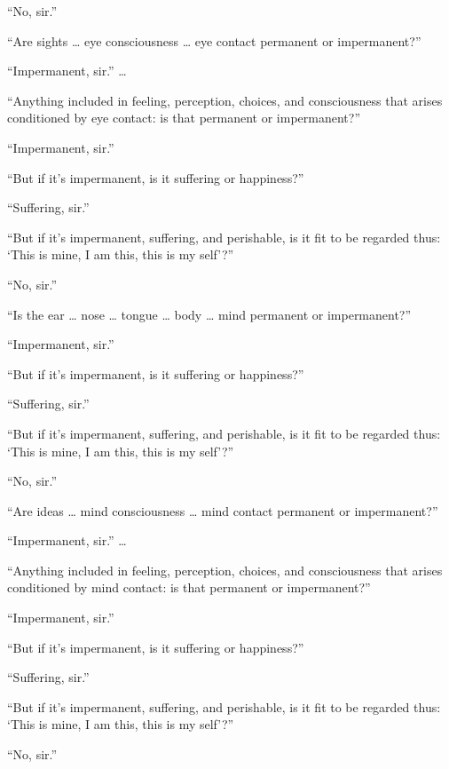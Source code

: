\documentclass[12pt,openany]{book}%
\begin{document}
“No, sir.” 

“Are sights … eye consciousness … eye contact permanent or impermanent?” 

“Impermanent, sir.” … 

“Anything included in feeling, perception, choices, and consciousness that arises conditioned by eye contact: is that permanent or impermanent?” 

“Impermanent, sir.” 

“But if it’s impermanent, is it suffering or happiness?” 

“Suffering, sir.” 

“But if it’s impermanent, suffering, and perishable, is it fit to be regarded thus: ‘This is mine, I am this, this is my self’?” 

“No, sir.” 

“Is the ear … nose … tongue … body … mind permanent or impermanent?” 

“Impermanent, sir.” 

“But if it’s impermanent, is it suffering or happiness?” 

“Suffering, sir.” 

“But if it’s impermanent, suffering, and perishable, is it fit to be regarded thus: ‘This is mine, I am this, this is my self’?” 

“No, sir.” 

“Are ideas … mind consciousness … mind contact permanent or impermanent?” 

“Impermanent, sir.” … 

“Anything included in feeling, perception, choices, and consciousness that arises conditioned by mind contact: is that permanent or impermanent?” 

“Impermanent, sir.” 

“But if it’s impermanent, is it suffering or happiness?” 

“Suffering, sir.” 

“But if it’s impermanent, suffering, and perishable, is it fit to be regarded thus: ‘This is mine, I am this, this is my self’?” 

“No, sir.” 
\end{document}
